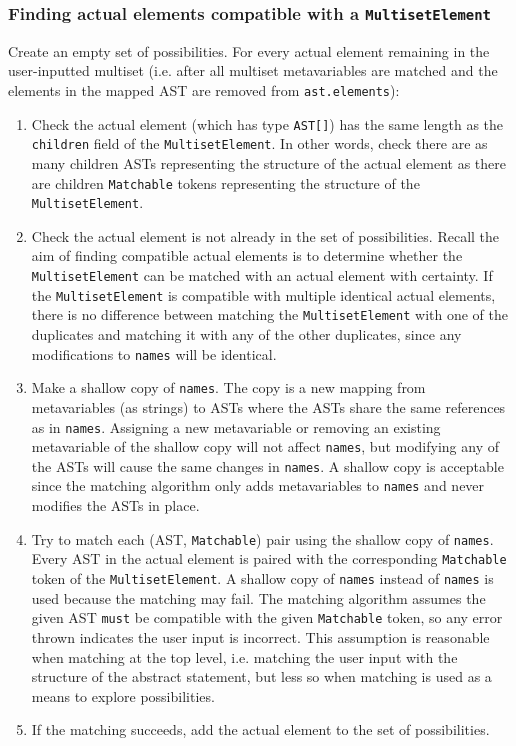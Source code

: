 \subsubsection{Finding actual elements compatible with a \texorpdfstring{\lstinline{MultisetElement}}{MultisetElement}}
Create an empty set of possibilities. For every actual element remaining in the user-inputted multiset (i.e. after all multiset metavariables are matched and the elements in the mapped AST are removed from \lstinline{ast.elements}):
\begin{enumerate}
    \item Check the actual element (which has type \lstinline{AST[]}) has the same length as the \lstinline{children} field of the \lstinline{MultisetElement}. In other words, check there are as many children ASTs representing the structure of the actual element as there are children \lstinline{Matchable} tokens representing the structure of the \lstinline{MultisetElement}.
    \item Check the actual element is not already in the set of possibilities. Recall the aim of finding compatible actual elements is to determine whether the \lstinline{MultisetElement} can be matched with an actual element with certainty. If the \lstinline{MultisetElement} is compatible with multiple identical actual elements, there is no difference between matching the \lstinline{MultisetElement} with one of the duplicates and matching it with any of the other duplicates, since any modifications to \lstinline{names} will be identical.
    \item Make a shallow copy of \lstinline{names}. The copy is a new mapping from metavariables (as strings) to ASTs where the ASTs share the same references as in \lstinline{names}. Assigning a new metavariable or removing an existing metavariable of the shallow copy will not affect \lstinline{names}, but modifying any of the ASTs will cause the same changes in \lstinline{names}. A shallow copy is acceptable since the matching algorithm only adds metavariables to \lstinline{names} and never modifies the ASTs in place.
    \item Try to match each (AST, \lstinline{Matchable}) pair using the shallow copy of \lstinline{names}. Every AST in the actual element is paired with the corresponding \lstinline{Matchable} token of the \lstinline{MultisetElement}. A shallow copy of \lstinline{names} instead of \lstinline{names} is used because the matching may fail. The matching algorithm assumes the given AST \lstinline{must} be compatible with the given \lstinline{Matchable} token, so any error thrown indicates the user input is incorrect. This assumption is reasonable when matching at the top level, i.e. matching the user input with the structure of the abstract statement, but less so when matching is used as a means to explore possibilities.
    \item If the matching succeeds, add the actual element to the set of possibilities.
\end{enumerate}

